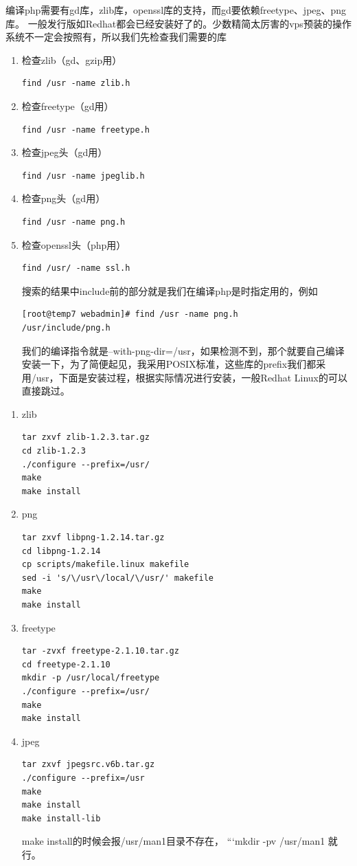 \documentclass{article}
\begin{document}
编译php需要有gd库，zlib库，openssl库的支持，而gd要依赖freetype、jpeg、png库。
一般发行版如Redhat都会已经安装好了的。少数精简太厉害的vps预装的操作系统不一定会按照有，所以我们先检查我们需要的库

\begin{enumerate}
\item 检查zlib（gd、gzip用）
\begin{verbatim}
find /usr -name zlib.h
\end{verbatim}
\item 检查freetype（gd用）
\begin{verbatim}
find /usr -name freetype.h
\end{verbatim}
\item 检查jpeg头（gd用）
\begin{verbatim}
find /usr -name jpeglib.h
\end{verbatim}
\item 检查png头（gd用）
\begin{verbatim}
find /usr -name png.h
\end{verbatim}
\item 检查openssl头（php用）
\begin{verbatim}
find /usr/ -name ssl.h
\end{verbatim}
搜索的结果中include前的部分就是我们在编译php是时指定用的，例如
\begin{verbatim}
[root@temp7 webadmin]# find /usr -name png.h
/usr/include/png.h
\end{verbatim}
我们的编译指令就是--with-png-dir=/usr，如果检测不到，那个就要自己编译安装一下，为了简便起见，我采用POSIX标准，这些库的prefix我们都采用/usr，下面是安装过程，根据实际情况进行安装，一般Redhat Linux的可以直接跳过。
\end{enumerate}

\begin{enumerate}
\item zlib
\begin{verbatim}
tar zxvf zlib-1.2.3.tar.gz
cd zlib-1.2.3
./configure --prefix=/usr/
make
make install
\end{verbatim}
\item png
\begin{verbatim}
tar zxvf libpng-1.2.14.tar.gz 
cd libpng-1.2.14 
cp scripts/makefile.linux makefile 
sed -i 's/\/usr\/local/\/usr/' makefile
make 
make install
\end{verbatim}
\item freetype
\begin{verbatim}
tar -zvxf freetype-2.1.10.tar.gz 
cd freetype-2.1.10 
mkdir -p /usr/local/freetype 
./configure --prefix=/usr/
make
make install
\end{verbatim}
\item jpeg
\begin{verbatim}
tar zxvf jpegsrc.v6b.tar.gz 
./configure --prefix=/usr 
make 
make install 
make install-lib
\end{verbatim}
make install的时候会报/usr/man1目录不存在，
```mkdir -pv /usr/man1
就行。
\end{enumerate}
\end{document}
